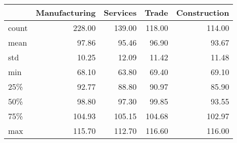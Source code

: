 \begin{tabular}{lrrrr}
\toprule
{} &  Manufacturing &  Services &  Trade &  Construction \\
\midrule
count &         228.00 &    139.00 & 118.00 &        114.00 \\
mean  &          97.86 &     95.46 &  96.90 &         93.67 \\
std   &          10.25 &     12.09 &  11.42 &         11.48 \\
min   &          68.10 &     63.80 &  69.40 &         69.10 \\
25\%   &          92.77 &     88.80 &  90.97 &         85.90 \\
50\%   &          98.80 &     97.30 &  99.85 &         93.55 \\
75\%   &         104.93 &    105.15 & 104.68 &        102.97 \\
max   &         115.70 &    112.70 & 116.60 &        116.00 \\
\bottomrule
\end{tabular}
